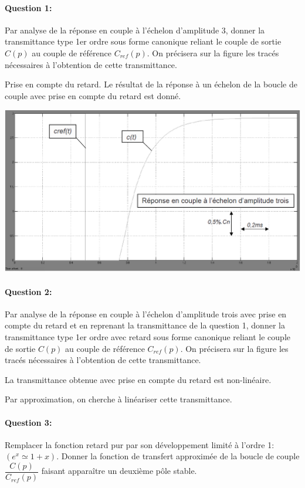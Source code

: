 \paragraph{Question 1:} Par analyse de la réponse en couple à l'échelon d'amplitude 3, donner la transmittance type 1er ordre sous forme canonique reliant le couple de sortie $C(p)$ au couple de référence $C_{ref}(p)$. On précisera sur la figure les tracés nécessaires à l'obtention de cette transmittance.

Prise en compte du retard. Le résultat de la réponse à un échelon de la boucle de couple avec prise en compte du retard est donné.

\begin{center}
 \includegraphics[width=0.8\linewidth]{img/img21}
\end{center}

\paragraph{Question 2:} Par analyse de la réponse en couple à l'échelon d'amplitude trois avec prise en compte du retard et en reprenant la transmittance de la question 1, donner la transmittance type 1er ordre avec retard sous forme canonique reliant le couple de sortie $C(p)$ au couple de référence $C_{ref}(p)$. On précisera sur la figure les tracés nécessaires à l'obtention de cette transmittance.

La transmittance obtenue avec prise en compte du retard est non-linéaire.

Par approximation, on cherche à linéariser cette transmittance.

\paragraph{Question 3:} Remplacer la fonction retard pur par son développement limité à l'ordre 1: $(e^x\simeq 1+x)$. Donner la fonction de transfert approximée de la boucle de couple $\dfrac{C(p)}{C_{ref}(p)}$ faisant apparaître un deuxième pôle stable.

